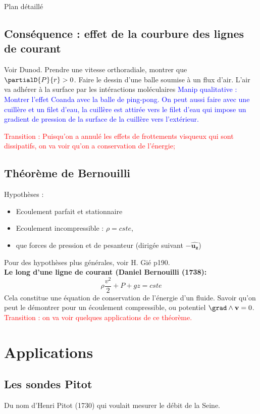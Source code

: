 \begin{reportBlock}{Plan détaillé}
\subsection{Conséquence : effet de la courbure des lignes de courant}
Voir Dunod. Prendre une vitesse orthoradiale, montrer que $\partialD{P}{r}>0$. Faire le dessin d'une balle soumise à un flux d'air. L'air va adhérer à la surface par les intéractions moléculaires \textcolor{blue}{Manip qualitative : Montrer l'effet Coanda avec la balle de ping-pong. On peut aussi faire avec une cuillère et un filet d'eau, la cuillère est attirée vers le filet d'eau qui impose un gradient de pression de la surface de la cuillère vers l'extérieur.}

\textcolor{red}{Transition : Puisqu'on a annulé les effets de frottements visqueux qui sont dissipatifs, on va voir qu'on a conservation de l'énergie;}

\subsection{Théorème de Bernouilli}
Hypothèses :
\begin{itemize}
    \item Ecoulement parfait et stationnaire
    \item Ecoulement incompressible : $\rho=cste$,
    \item que forces de pression et de pesanteur (dirigée suivant $-\mathbf{\hat{u_z}}$)
\end{itemize}
Pour des hypothèses plus générales, voir H. Gié p190.\\

\textbf{Le long d'une ligne de courant (Daniel Bernouilli (1738):}
\begin{equation}
    \rho\frac{v^2}{2}+P+gz = cste
\end{equation}
Cela constitue une équation de conservation de l'énergie d'un fluide. Savoir qu'on peut le démontrer pour un écoulement compressible, ou potentiel $\grad\wedge\mathbf{v}=0$.\\

\textcolor{red}{Transition : on va voir quelques applications de ce théorème.}

\section{Applications}

\subsection{Les sondes Pitot}
Du nom d'Henri Pitot (1730) qui voulait mesurer le débit de la Seine.\\


\end{reportBlock}
